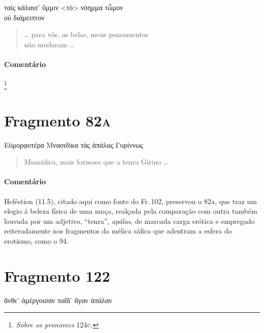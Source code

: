 \begin{gkverse}
ταὶς κάλαισ’ ὔμμιν <τὸ> νόημμα τὦμον\\
       οὐ διάμειπτον
\end{gkverse}

\begin{verse}
\ldots{} para vós, as belas, meus pensamentos\\
não mudaram \ldots{}
\end{verse}

\medskip

\paragraph{Comentário} \footnote{\emph{Sobre os pronomes} 124\textsc{c}.} 


\section{Fragmento 82\textsc{a}}

\begin{gkverse}
Εὐμορφοτέρα Μνασιδίκα τὰς ἀπάλας Γυρίννως
\end{gkverse}

\begin{verse}
Mnasidica, mais formosa que a tenra Girino \ldots{}
\end{verse}

\medskip

\paragraph{Comentário} Heféstion (11.5), citado aqui como fonte do Fr.\,102, preservou o 82\textsc{a}, que traz
um elogio à beleza física de uma moça, realçada pela comparação com outra
também louvada por um adjetivo, ``tenra'', \emph{apálas}, de marcada
carga erótica e empregado reiteradamente nos fragmentos da mélica sáfica que
adentram a esfera do erotismo, como o 94.


\section{Fragmento 122}

\begin{gkverse}
ἄνθε’ ἀμέργοισαν παῖδ’ ἄγαν ἀπάλαν
\end{gkverse}

